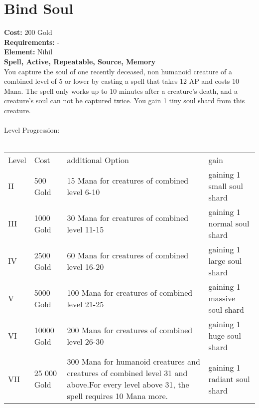 \section{Bind Soul}
\textbf{Cost:} 200 Gold\\
\textbf{Requirements:} -\\
\textbf{Element:} Nihil\\
\textbf{Spell, Active, Repeatable, Source, Memory}\\
You capture the soul of one recently deceased, non humanoid creature of a combined level of 5 or lower by casting a spell that takes 12 AP and costs 10 Mana. The spell only works up to 10 minutes after a creature’s death, and a creature’s soul can not be captured twice. You gain 1 tiny soul shard from this creature.\\
\\
Level Progression:\\
\\
\begin{tabular}{l | l | p{5.5cm} | p{2.5cm}}
    Level & Cost & additional Option & gain\\
    II & 500 Gold & 15 Mana for creatures of combined level 6-10 & gaining 1 small soul shard\\
    III & 1000 Gold & 30 Mana for creatures of combined level 11-15 & gaining 1 normal soul shard\\
    IV & 2500 Gold & 60 Mana for creatures of combined level 16-20 & gaining 1 large soul shard\\
    V & 5000 Gold & 100 Mana for creatures of combined level 21-25 & gaining 1 massive soul shard\\
    VI & 10000 Gold & 200 Mana for creatures of combined level 26-30 & gaining 1 huge soul shard\\
    VII & 25 000 Gold & 300 Mana for humanoid creatures and creatures of combined level 31 and above.\linebreak For every level above 31, the spell requires 10 Mana more. & gaining 1 radiant soul shard\\
\end{tabular}